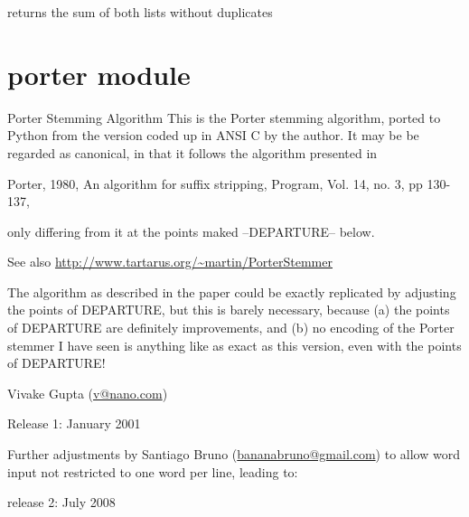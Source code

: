 \documentclass[letterpaper,10pt,english]{sphinxmanual}
\begin{document}

\begin{fulllineitems}
\label{\detokenize{logic:logic.union}}
returns the sum of both lists without duplicates

\end{fulllineitems}



\chapter{porter module}
\label{\detokenize{porter:porter-module}}\label{\detokenize{porter::doc}}\label{\detokenize{porter:module-porter}}
Porter Stemming Algorithm
This is the Porter stemming algorithm, ported to Python from the
version coded up in ANSI C by the author. It may be be regarded
as canonical, in that it follows the algorithm presented in

Porter, 1980, An algorithm for suffix stripping, Program, Vol. 14,
no. 3, pp 130-137,

only differing from it at the points maked --DEPARTURE-- below.

See also \url{http://www.tartarus.org/~martin/PorterStemmer}

The algorithm as described in the paper could be exactly replicated
by adjusting the points of DEPARTURE, but this is barely necessary,
because (a) the points of DEPARTURE are definitely improvements, and
(b) no encoding of the Porter stemmer I have seen is anything like
as exact as this version, even with the points of DEPARTURE!

Vivake Gupta (\href{mailto:v@nano.com}{v@nano.com})

Release 1: January 2001

Further adjustments by Santiago Bruno (\href{mailto:bananabruno@gmail.com}{bananabruno@gmail.com})
to allow word input not restricted to one word per line, leading
to:

release 2: July 2008
\end{document}
